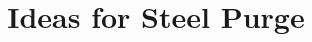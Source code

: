\documentclass[12pt]{article}
\title{Ideas for Steel Purge}
\begin{document}
\maketitle{}
\end{document}

